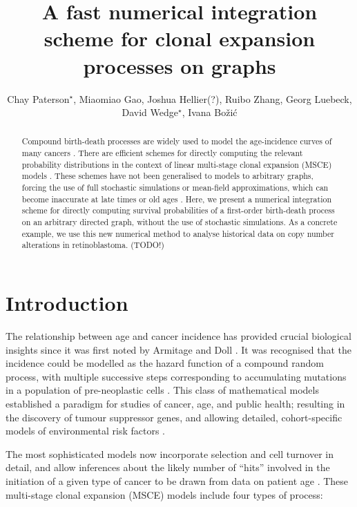 \documentclass{article}
\title{A fast numerical integration scheme for clonal expansion processes on graphs}
\author{Chay Paterson${}^\star$, Miaomiao Gao, Joshua Hellier(?), Ruibo Zhang, Georg Luebeck, David Wedge${}^\star$, Ivana Bo\v{z}i\'{c}}
\begin{document}
\maketitle

\begin{abstract}
Compound birth-death processes are widely used to model the age-incidence curves
of many cancers \cite{luebeck2013impact}. There are efficient schemes for
directly computing the relevant %
probability distributions in the context of linear multi-stage clonal expansion
(MSCE) models \cite{meza2008age}. These schemes have not been generalised to
models to arbitrary graphs, forcing the use of full stochastic simulations or
mean-field approximations, which can become inaccurate at late times or old ages
\cite{patersonbozic2020colorectal,Paterson2021vs}.
Here, we present a numerical integration scheme for directly computing survival
probabilities of a first-order birth-death process on an arbitrary
directed graph, without the use of stochastic
simulations. As a concrete example, we use this new numerical method to analyse
historical data on copy number alterations in retinoblastoma. (TODO!)
\end{abstract}

\section{Introduction}

The relationship between age and cancer incidence has provided crucial
biological insights since it was first noted by Armitage and Doll
\cite{armitage_doll,armitage1957two,knudson1971mutation}. It was 
recognised that the incidence could be modelled as the hazard function of a
compound random process, with multiple successive steps corresponding to
accumulating mutations in a population of pre-neoplastic cells
\cite{armitage_doll,moolgavkar1979two}. This class of mathematical models
established a paradigm for studies of cancer, age, and public health; resulting
in the discovery of tumour suppressor genes, and allowing detailed,
cohort-specific models of environmental risk factors
\cite{knudson1971mutation,conolly2003biologically,meza2008age}. 

The most sophisticated
models now incorporate selection and cell turnover in detail, and allow
inferences about the likely number of ``hits'' involved in the initiation of a
given type of cancer to be drawn from data on patient age \cite{moolgavkar1992multistage,luebeck2013impact}. These multi-stage clonal expansion (MSCE) models include four types of process:
\end{document}

